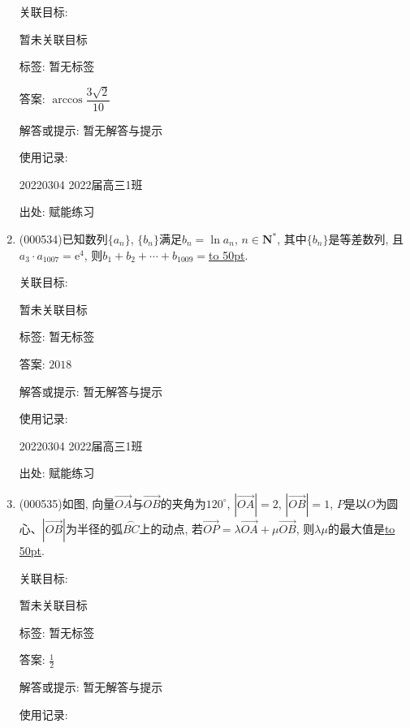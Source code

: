 \documentclass[10pt,a4paper]{article}
\newcommand{\blank}[1]{\underline{\hbox to #1pt{}}}
\begin{document}
\begin{enumerate}[1.]
关联目标:

暂未关联目标



标签: 暂无标签

答案: $\arccos \dfrac{3\sqrt 2}{10}$

解答或提示: 暂无解答与提示

使用记录:

20220304	2022届高三1班	


出处: 赋能练习
\item { (000534)}已知数列$\{a_n\}$, $\{b_n\}$满足$b_n=\ln a_n$, $n\in \mathbf{N}^*$, 其中$\{b_n\}$是等差数列, 且$a_3\cdot a_{1007}=\mathrm{e}^4$, 则$b_1+b_2+\cdots +b_{1009}=$\blank{50}.


关联目标:

暂未关联目标



标签: 暂无标签

答案: $2018$

解答或提示: 暂无解答与提示

使用记录:

20220304	2022届高三1班	


出处: 赋能练习
\item { (000535)}如图, 向量$\overrightarrow{OA}$与$\overrightarrow{OB}$的夹角为$120^\circ$, $|\overrightarrow{OA}|=2$, $|\overrightarrow{OB}|=1$, $P$是以$O$为圆心、$|\overrightarrow{OB}|$为半径的弧$\overset\frown{BC}$上的动点, 若$\overrightarrow{OP}=\lambda \overrightarrow{OA}+\mu \overrightarrow{OB}$, 则$\lambda \mu$的最大值是\blank{50}.
\begin{center}
\end{center}


关联目标:

暂未关联目标



标签: 暂无标签

答案: $\frac 12$

解答或提示: 暂无解答与提示

使用记录:


\end{enumerate}
\end{document}
